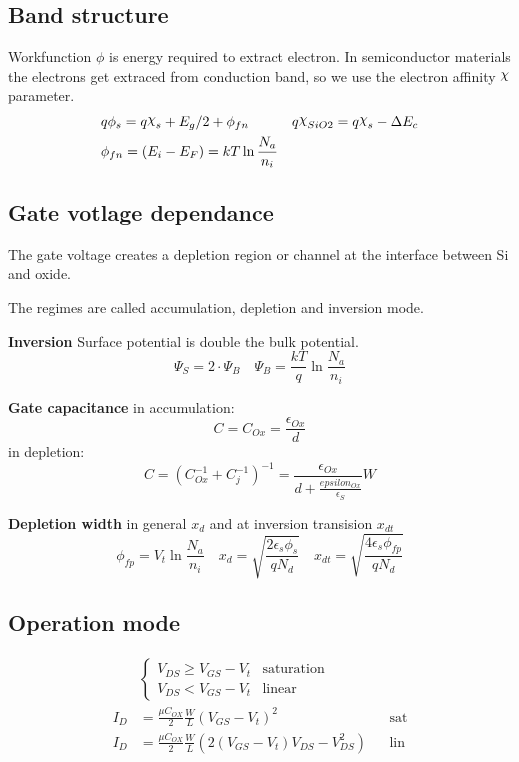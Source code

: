 \documentclass[a4paper, fontsize=8pt, landscape, DIV=1]{scrartcl}
\begin{document}
\begin{multicols*}{4}
    \subsection{Band structure}
    Workfunction $\phi$ is energy required to extract electron. 
    In semiconductor materials the electrons get extraced from conduction band, so we use
    the electron affinity $\altchi$ parameter.
    \begin{align*}
      &q\phi_s = q\altchi_s + E_g/2 + \phi_{fn} & q\altchi_{SiO2} = q\altchi_s - \Delta E_c \\
      &\phi_{fn} = (E_i - E_F) = kT\ln\frac{N_a}{n_i}
    \end{align*}

    \subsection{Gate votlage dependance}
    The gate voltage creates a depletion region or channel at the interface between Si and oxide.

    The regimes are called accumulation, depletion and inversion mode.

    \textbf{Inversion} 
    Surface potential is double the bulk potential.
    \[\Psi_S = 2\cdot\Psi_B \quad \Psi_B = \frac{kT}{q}\ln\frac{N_a}{n_i}\]

    \textbf{Gate capacitance} 
    in accumulation:
    \[C = C_{Ox} = \frac{\epsilon_{Ox}}{d} \]
    in depletion:
    \[C = (C_{Ox}^{-1}+C_{j}^{-1})^{-1} = \frac{\epsilon_{Ox}}{d + \frac{epsilon_{Ox}}{\epsilon_S}}W \]

    \textbf{Depletion width} in general $x_d$ and at inversion transision $x_{dt}$
    \[\phi_{fp} = V_t\ln\frac{N_a}{n_i} \quad x_d = \sqrt{\frac{2\epsilon_s\phi_s}{qN_d}} \quad x_{dt} = \sqrt{\frac{4\epsilon_s\phi_{fp}}{qN_d}}\]
    
    \subsection{Operation mode}
    \begin{align*}
      &\begin{cases}
        V_{DS} \geq V_{GS} - V_t & \text{saturation} \\
        V_{DS}  <   V_{GS} - V_t & \text{linear}
      \end{cases} \\
      I_{D} &= \frac{\mu C_{OX}}{2}\frac{W}{L} (V_{GS} - V_t) ^2 && \text{sat} \\
      I_{D} &= \frac{\mu C_{OX}}{2}\frac{W}{L} \left( 2(V_{GS} - V_t) V_{DS} - V_{DS}^2 \right) && \text{lin} 
    \end{align*}


\end{multicols*}
\end{document}
